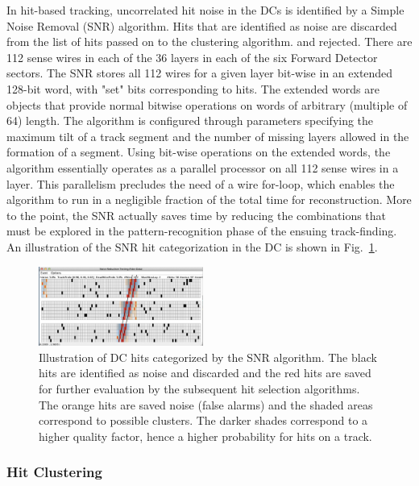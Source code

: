 In hit-based tracking, uncorrelated hit noise in the DCs is identified by a Simple Noise Removal (SNR) algorithm.  Hits that are identified as noise are discarded from the list of hits passed on to the clustering algorithm.
and rejected. There are 112 sense wires in each of the 36 layers in each of the six Forward Detector sectors. The SNR stores all 112 wires for a given layer bit-wise in an extended 128-bit word, with "set" bits corresponding to hits. The extended words are objects that provide normal bitwise operations on words of arbitrary (multiple of 64) length. The algorithm is
configured through parameters specifying the maximum tilt of a track segment and the number of missing layers
allowed in the formation of a segment. Using bit-wise operations on the extended words, the algorithm essentially
operates as a parallel processor on all 112 sense wires in a layer. This parallelism precludes the need of a wire
for-loop, which enables the algorithm to run in a negligible fraction of the total time for reconstruction. More to the
point, the SNR actually saves time by reducing the combinations that must be explored in the pattern-recognition
phase of the ensuing track-finding. An illustration of the SNR hit categorization in the DC is shown in
Fig.~\ref{fig:snr}.

\begin{figure}
\centering
\includegraphics[width=0.48\textwidth]{pics/dcPattern9.png}
\caption{Illustration of DC hits categorized by the SNR algorithm. The black hits are identified as noise and
  discarded and the red hits are saved for further evaluation by the subsequent hit selection algorithms. The orange hits are saved noise (false alarms) and the shaded areas correspond to possible clusters.
  The darker shades correspond to a higher quality factor, hence a higher probability for hits on a track.}
\label{fig:snr}
\end{figure}

\subsubsection{Hit Clustering}

